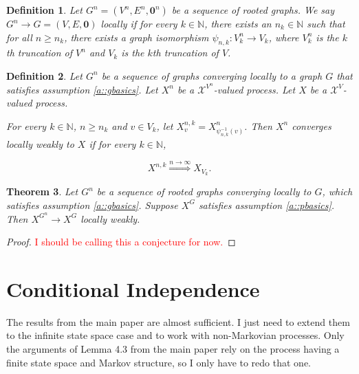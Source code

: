 \documentclass[12pt]{article}
\newcommand{\mb}{\mathbb}
\newcommand{\mc}{\mathcal}
\newcommand{\ra}{\rightarrow}
\newcommand{\os}{\overset}
\newcommand{\tr}{\textcolor{red}}
\newcommand{\ind}{\hspace{24pt}}
\newcommand{\sta}{\mc{X}}							%
\renewcommand{\root}{\mathbf{0}}
\newcommand{\indx}[1]{^{#1}}						%
\newcommand{\Xf}{X}									%
\newcommand{\vind}[1]{_{#1}}						%
\newcommand{\gind}[1]{^{#1}}						%
\newcommand{\trnc}[1]{_{#1}}						%
\newtheorem{thms}{Theorem}[section]
\newtheorem{defn}[thms]{Definition}
\begin{document}
\begin{defn}
Let \(G\indx{n} = (V\indx{n},E\indx{n},\root\indx{n})\) be a sequence of rooted graphs. We say \(G\indx{n} \ra G = (V,E,\root)\) locally if for every \(k\in \mb{N}\), there exists an \(n_k \in \mb{N}\) such that for all \(n \geq n_k\), there exists a graph isomorphism \(\psi_{n,k}: V\indx{n}\trnc{k} \ra V\trnc{k}\), where \(V\indx{n}\trnc{k}\) is the \(k\)th truncation of \(V\indx{n}\) and \(V\trnc{k}\) is the \(k\)th truncation of \(V\).
\label{WP::locconv}
\end{defn}

\begin{defn}
Let \(G^n\) be a sequence of graphs converging locally to a graph \(G\) that satisfies assumption \ref{a::gbasics}. Let \(\Xf\indx{n}\) be a \(\sta^{V\indx{n}}\)-valued process. Let \(\Xf\) be a \(\sta^V\)-valued process. 

\ind For every \(k\in \mb{N}\), \(n \geq n_k\) and \(v \in V\trnc{k}\), let \(\Xf\indx{n,k}\vind{v} = \Xf\indx{n}\vind{\psi_{n,k}^{-1}(v)}\). Then \(\Xf^n\) converges locally weakly to \(\Xf\) if for every \(k \in \mb{N}\),

\[\Xf^{n,k} \os{n\ra\infty}{\Rightarrow} \Xf_{V_k}.\]
\label{WP::locweak}
\end{defn}

\begin{thms}
Let \(G\indx{n}\) be a sequence of rooted graphs converging locally to \(G\), which satisfies assumption \ref{a::gbasics}. Suppose \(\Xf\gind{G}\) satisfies assumption \ref{a::pbasics}. Then \(\Xf\gind{G\indx{n}} \ra \Xf\gind{G}\) locally weakly.
\label{WP::lblocweak}
\end{thms}
\begin{proof}
\tr{I should be calling this a conjecture for now.}
\end{proof}

\section{Conditional Independence}
\label{CI}

The results from the main paper are almost sufficient. I just need to extend them to the infinite state space case and to work with non-Markovian processes. Only the arguments of Lemma 4.3 from the main paper rely on the process having a finite state space and Markov structure, so I only have to redo that one.
\end{document}
